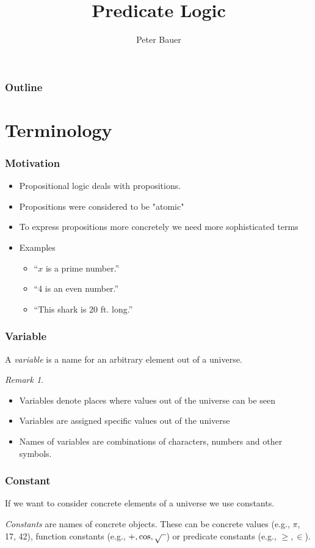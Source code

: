 \documentclass{beamer}
\title{Predicate Logic}
\author{Peter Bauer}
\date{} %
\theoremstyle{remark}
\newtheorem{remark}[theorem]{Remark}
\begin{document}
\frame{\titlepage}

\begin{frame}
	\frametitle{Outline}
	\tableofcontents
\end{frame}

\section{Terminology}
\begin{frame}
\frametitle{Motivation}
\begin{itemize}
	\item Propositional logic deals with propositions.
	\pause
	\item Propositions were considered to be "atomic"
	\pause
	\item To express propositions more concretely we need more sophisticated terms
	\pause
	\item Examples
	\begin{itemize}
		\item ``$x$ is a prime number.''
		\item ``4 is an even number.''
		\item ``This shark is 20 ft. long.''
	\end{itemize}
\end{itemize}	
	
\end{frame}

\begin{frame}
\frametitle{Variable}
\begin{definition}
A {\em variable} is a name for an arbitrary element out of a universe.
\end{definition}

\pause
\begin{remark}
\begin{itemize}
 	\item Variables denote places where values out of the universe can be seen
	\pause
	\item Variables are assigned specific values out of the universe
	\pause
	\item Names of variables are combinations of characters, numbers and other symbols.
\end{itemize}

\end{remark}
\end{frame}

\begin{frame}
 \frametitle{Constant}
 If  we want to consider concrete elements of a universe we use constants.
 \pause
\begin{definition}
{\em Constants} are names of concrete objects. These can be concrete values (e.g., $\pi$, 17, 42), function constants (e.g., $+, \cos, \sqrt{\hspace{.5em} }$) or predicate constants (e.g., $\geq, \in$).
\end{definition}
\end{frame}
\end{document}
